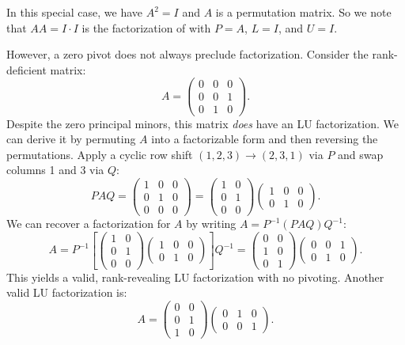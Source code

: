 \documentclass[10pt,twoside]{siamart1116}
\numberwithin{theorem}{section}
\begin{document}
In this special case, we have $A^2 = I$ and $A$ is a permutation matrix. So we note that $A A = I \cdot I$ is the factorization of  with $P = A$, $L = I$, and $U = I$.

However, a zero pivot does not always preclude factorization. Consider the rank-deficient matrix:
\[
  A =
  \begin{pmatrix} 0 & 0 & 0 \\ 0 & 0 & 1 \\ 0 & 1 & 0
  \end{pmatrix}.
\]
Despite the zero principal minors, this matrix \emph{does} have an LU factorization. We can derive it by permuting $A$ into a factorizable form and then reversing the permutations. Apply a cyclic row shift $(1,2,3) \to (2,3,1)$ via $P$ and swap columns 1 and 3 via $Q$:
\[
  PAQ =
  \begin{pmatrix} 1 & 0 & 0 \\ 0 & 1 & 0 \\ 0 & 0 & 0
  \end{pmatrix}
  =
  \begin{pmatrix} 1 & 0 \\ 0 & 1 \\ 0 & 0
  \end{pmatrix}
  \begin{pmatrix} 1 & 0 & 0 \\ 0 & 1 & 0
  \end{pmatrix}.
\]
We can recover a factorization for $A$ by writing $A = P^{-1} (PAQ) Q^{-1}$:
\[
  A = P^{-1} \left[
    \begin{pmatrix} 1 & 0 \\ 0 & 1 \\ 0 & 0
    \end{pmatrix}
    \begin{pmatrix} 1 & 0 & 0 \\ 0 & 1 & 0
  \end{pmatrix} \right] Q^{-1} =
  \begin{pmatrix} 0 & 0 \\ 1 & 0 \\ 0 & 1
  \end{pmatrix}
  \begin{pmatrix} 0 & 0 & 1 \\ 0 & 1 & 0
  \end{pmatrix}.
\]
This yields a valid, rank-revealing LU factorization with no pivoting. Another valid LU factorization is:
\[
  A =
  \begin{pmatrix} 0 & 0 \\ 0 & 1 \\ 1 & 0
  \end{pmatrix}
  \begin{pmatrix} 0 & 1 & 0 \\ 0 & 0 & 1
  \end{pmatrix}.
\]
\end{document}
